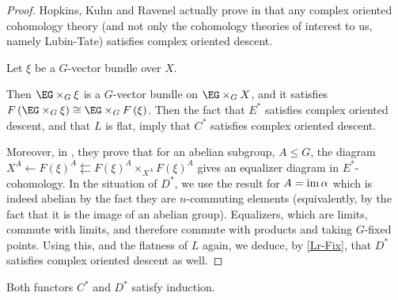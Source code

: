 \begin{proof}
	Hopkins, Kuhn and Ravenel actually prove in \cite[2.5]{HKR} that any complex oriented cohomology theory (and not only the cohomology theories of interest to us, namely Lubin-Tate) satisfies complex oriented descent.
	
	Let $\xi$ be a $G$-vector bundle over $X$.
	
	Then $\EG \times_G \xi$ is a $G$-vector bundle on $\EG \times_G X$, and it satisfies $F\left(\EG \times_G \xi\right) \cong \EG \times_G F\left(\xi\right)$.
	Then the fact that $E^*$ satisfies complex oriented descent, and that $L$ is flat, imply that $C^*$ satisfies complex oriented descent.
	
	Moreover, in \cite[2.6]{HKR}, they prove that for an abelian subgroup, $A \leq G$, the diagram $X^A \leftarrow F\left(\xi\right)^A \leftleftarrows F\left(\xi\right)^A \times_{X^A} F\left(\xi\right)^A$ gives an equalizer diagram in $E^*$-cohomology.
	In the situation of $D^*$, we use the result for $A = \operatorname{im} \alpha$ which is indeed abelian by the fact they are $n$-commuting elements (equivalently, by the fact that it is the image of an abelian group).
	Equalizers, which are limits, commute with limits, and therefore commute with products and taking $G$-fixed points.
	Using this, and the flatness of $L$ again, we deduce, by \ref{Lr-Fix}, that $D^*$ satisfies complex oriented descent as well.
\end{proof}

\begin{lemma}
	Both functors $C^*$ and $D^*$ satisfy induction.
\end{lemma}

